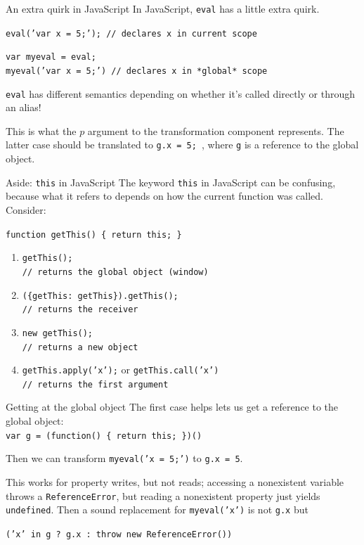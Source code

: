 \documentclass{beamer}
\begin{document}
\begin{frame}{An extra quirk in JavaScript}
In JavaScript, {\tt eval} has a little extra quirk. \vspace{5mm}

{\tt eval('var x = 5;'); // declares x in current scope} \vspace{5mm}

{\tt var myeval = eval;} \\
{\tt myeval('var x = 5;') // declares x in *global* scope} \vspace{5mm}

{\tt eval} has different semantics depending on whether it's called
directly or through an alias! \vspace{5mm}

This is what the $p$ argument to the transformation component represents.
The latter case should be translated to {\tt g.x = 5; }, where {\tt g} is
a reference to the global object.
\end{frame}

\begin{frame}{Aside: {\tt this} in JavaScript}
The keyword {\tt this} in JavaScript can be confusing, because what it
refers to depends on how the current function was called. Consider: \vspace{2mm}

{\tt function getThis() \{ return this; \}}
\vspace{2mm}

\begin{enumerate}
\item {\tt getThis();} \\
{\tt // returns the global object (window)}
\item {\tt (\{getThis: getThis\}).getThis();} \\
{\tt // returns the receiver}
\item {\tt new getThis();} \\
{\tt // returns a new object}
\item {\tt getThis.apply('x');} or {\tt getThis.call('x')} \\
{\tt // returns the first argument }
\end{enumerate}
\end{frame}

\begin{frame}{Getting at the global object}
The first case helps lets us get a reference to the global object: \\ 
{\tt var g = (function() \{ return this; \})()}  \vspace{5mm}

Then we can transform {\tt myeval('x = 5;')} to {\tt g.x = 5}. \vspace{5mm}

This works for property writes, but not reads; accessing a nonexistent
variable throws a {\tt ReferenceError}, but reading a nonexistent
property just yields {\tt undefined}. Then a sound replacement for
{\tt myeval('x')} is not {\tt g.x} but \vspace{5mm}

{\tt ('x' in g ? g.x : throw new ReferenceError())}
\end{frame}
\end{document}
